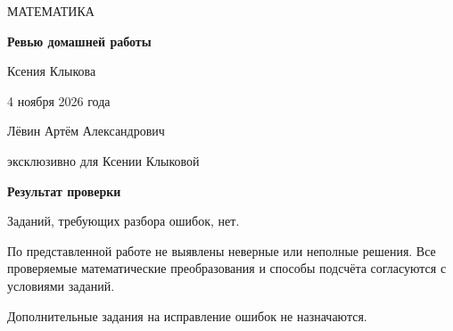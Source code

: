 \documentclass[a4paper,12pt]{article}
\begin{document}
\thispagestyle{empty}
\begin{titlepage}
\centering
\vspace*{37mm}
{\small\color{muted}\MakeUppercase{Математика}}\par
\vspace{23mm}
{\Huge\bfseries\color{ink}Ревью домашней работы\par}
\vspace{24mm}
{\large\color{accent}Ксения Клыкова\par}
\vspace{8mm}
{\normalsize\color{muted}4 ноября 2026 года\par}
\vfill
{\normalsize\color{ink}Лёвин Артём Александрович\par}
\vspace{4mm}
{\small\color{muted}эксклюзивно для Ксении Клыковой\par}
\vspace{13mm}
\end{titlepage}

\thispagestyle{fancy}
\vspace*{29mm}
{\LARGE\bfseries\color{accent}Результат проверки\par}
\vspace{14mm}
{\large\color{ink}Заданий, требующих разбора ошибок, нет.\par}
\vspace{10mm}
По представленной работе не выявлены неверные или неполные решения.
Все проверяемые математические преобразования и способы подсчёта согласуются с условиями заданий.

\vspace{12mm}

\vspace{6mm}
{\small\color{muted}Дополнительные задания на исправление ошибок не назначаются.}
\end{document}
